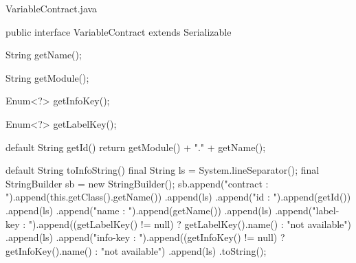 \begin{program}[h]
\caption{VariableContract.java}
\label{prog:variableContract}
\begin{JavaCode}
public interface VariableContract extends Serializable {

    String getName();

    String getModule();

    Enum<?> getInfoKey();

    Enum<?> getLabelKey();

    default String getId() {      
        return getModule() + "." + getName();
    }

    default String toInfoString() {
        final String ls = System.lineSeparator();
        final StringBuilder sb = new StringBuilder();
        sb.append("contract  : ").append(this.getClass().getName())
          .append(ls)
          .append("id        : ").append(getId())
          .append(ls)
          .append("name      : ").append(getName())
          .append(ls)
          .append("label-key : ").append((getLabelKey() != null) 
                                          ? getLabelKey().name() 
                                          : "not available")
          .append(ls)
          .append("info-key  : ").append((getInfoKey() != null) 
                                          ? getInfoKey().name() 
                                          : "not available")
          .append(ls)
          .toString();
    }
}
\end{JavaCode}
\end{program}

